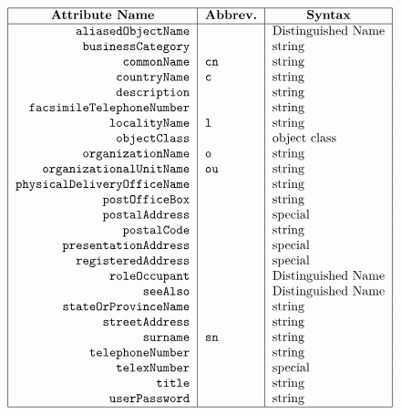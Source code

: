 
\smaller

\[\begin{tabular}{|r|l|l|}
\hline
\multicolumn{1}{|c|}{\bf Attribute Name}&
	\multicolumn{1}{c|}{\bf Abbrev.}&
			\multicolumn{1}{c|}{\bf Syntax}\\
\hline
\verb"aliasedObjectName"&&Distinguished Name\\
\verb"businessCategory"&&string\\
\verb"commonName"&\verb"cn"&string\\
\verb"countryName"&\verb"c"&string\\
\verb"description"&&string\\
\verb"facsimileTelephoneNumber"&&string\\
\verb"localityName"&\verb"l"&string\\
\verb"objectClass"&&object class\\
\verb"organizationName"&\verb"o"&string\\
\verb"organizationalUnitName"&\verb"ou"&string\\
\verb"physicalDeliveryOfficeName"&&string\\
\verb"postOfficeBox"&&string\\
\verb"postalAddress"&&special\\
\verb"postalCode"&&string\\
\verb"presentationAddress"&&special\\
\verb"registeredAddress"&&special\\
\verb"roleOccupant"&&Distinguished Name\\
\verb"seeAlso"&&Distinguished Name\\
\verb"stateOrProvinceName"&&string\\
\verb"streetAddress"&&string\\
\verb"surname"&\verb"sn"&string\\
\verb"telephoneNumber"&&string\\
\verb"telexNumber"&&special\\
\verb"title"&&string\\
\verb"userPassword"&&string\\
\hline
\end{tabular}\]
